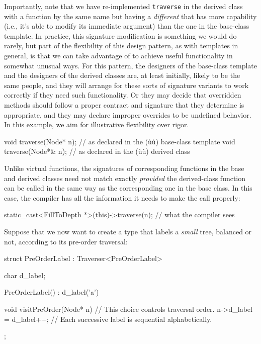 Importantly, note that we have re-implemented \lstinline!traverse! in the
derived class with a function by the same name but having a
\emph{different}  that has more capability (i.e., it's able
to modify its immediate argument) than the one in the base-class
template. In practice, this signature modification is something we would
do rarely, but part of the flexibility of this design pattern, as with
templates in general, is that we can take advantage of  to achieve useful functionality in somewhat unusual ways. For
this pattern, the designers of the base-class template and the designers
of the derived classes are, at least initially, likely to be the same
people, and they will arrange for these sorts of signature variants to
work correctly if they need such functionality. Or they may decide that
overridden methods should follow a proper contract and signature that
they determine is appropriate, and they may declare improper overrides
to be undefined behavior. In this example, we aim for illustrative
flexibility over rigor.

\begin{emcppslisting}[emcppsbatch=e9]
void traverse(Node* n);   // as declared in the (ù{}ù) base-class template
void traverse(Node*& n);  // as declared in the (ù{}ù) derived class
\end{emcppslisting}
    
\noindent Unlike virtual functions, the signatures of corresponding functions in
the base and derived classes need not match exactly \emph{provided} the
derived-class function can be called in the same way as the
corresponding one in the base class. In this case, the compiler has all
the information it needs to make the call properly:

\begin{emcppslisting}[emcppsignore={illustrative only}]
static_cast<FillToDepth *>(this)->traverse(n);  // what the compiler sees
\end{emcppslisting}
    
\noindent Suppose that we now want to create a type that labels a \emph{small}
tree, balanced or not, according to its pre-order traversal:

\begin{emcppslisting}[emcppsbatch=e9]
struct PreOrderLabel : Traverser<PreOrderLabel>
{
    char d_label;

    PreOrderLabel() : d_label('a') { }

    void visitPreOrder(Node* n)  // This choice controls traversal order.
    {
        n->d_label = d_label++;   
            // Each successive label is sequential alphabetically.
    }
};
\end{emcppslisting}
    
